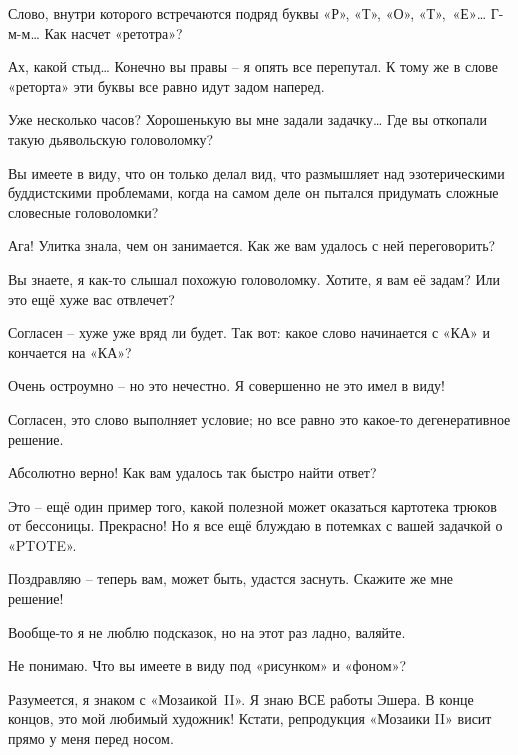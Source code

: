 \documentclass[../main.tex]{subfiles}
\begin{document}
\begin{dialogue}
 Слово, внутри которого встречаются подряд буквы «Р», «Т», «О», «Т»,~«Е»\ldots{} Г-м-м\ldots{} Как насчет «ретотра»?

 Ах, какой стыд\ldots{} Конечно вы правы \--- я опять все перепутал. К тому же в слове «реторта» эти буквы все равно идут задом наперед.

 Уже несколько часов? Хорошенькую вы мне задали задачку\ldots{} Где вы откопали такую дьявольскую головоломку?

 Вы имеете в виду, что он только делал вид, что размышляет над эзотерическими буддистскими проблемами, когда на самом деле он пытался придумать сложные словесные головоломки?

 Ага! Улитка знала, чем он занимается. Как же вам удалось с ней переговорить?

 Вы знаете, я как-то слышал похожую головоломку. Хотите, я вам её задам? Или это ещё хуже вас отвлечет?

 Согласен \--- хуже уже вряд ли будет. Так вот: какое слово начинается с «КА» и кончается на «КА»?

 Очень остроумно \--- но это нечестно. Я совершенно не это имел в виду!

 Согласен, это слово выполняет условие; но все равно это какое-то дегенеративное решение.

 Абсолютно верно! Как вам удалось так быстро найти ответ?

 Это \--- ещё один пример того, какой полезной может оказаться картотека трюков от бессоницы. Прекрасно! Но я все ещё блуждаю в потемках с вашей задачкой о «PTOTE».

 Поздравляю \--- теперь вам, может быть, удастся заснуть. Скажите же мне решение!

 Вообще-то я не люблю подсказок, но на этот раз ладно, валяйте.

 Не понимаю. Что вы имеете в виду под «рисунком» и «фоном»?


 Разумеется, я знаком с «Мозаикой~II». Я знаю ВСЕ работы Эшера. В конце концов, это мой любимый художник! Кстати, репродукция «Мозаики II» висит прямо у меня перед носом.


\end{dialogue}
\end{document}
